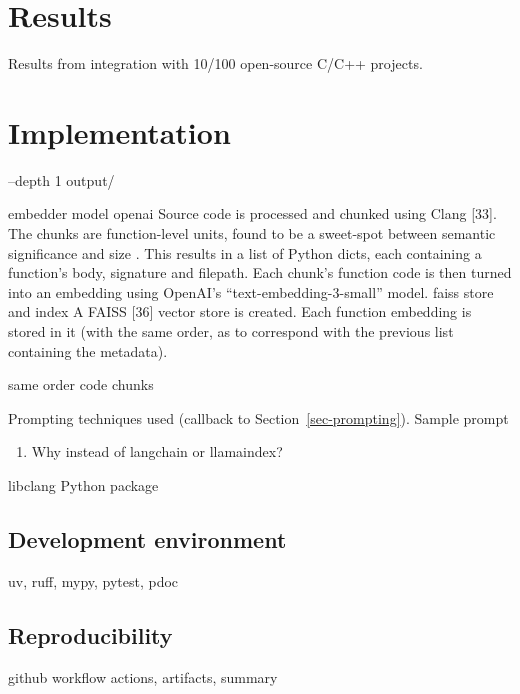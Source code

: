 \documentclass[
  a4paper,
  DIV=11,
  numbers=noendperiod]{scrreprt}
\providecommand{\tightlist}{%
  \setlength{\itemsep}{0pt}\setlength{\parskip}{0pt}}
\theoremstyle{definition}
\theoremstyle{remark}
\begin{document}
\chapter{Results}\label{results}

Results from integration with 10/100 open-source C/C++ projects.


\chapter{Implementation}\label{sec-implementation}

--depth 1 output/

embedder model openai Source code is processed and chunked using Clang
{[}33{]}. The chunks are function-level units, found to be a sweet-spot
between semantic significance and size \autocite{zhao2024,chen2021}.
This results in a list of Python dicts, each containing a function's
body, signature and filepath. Each chunk's function code is then turned
into an embedding using OpenAI's ``text-embedding-3-small'' model. faiss
store and index A FAISS {[}36{]} vector store is created. Each function
embedding is stored in it (with the same order, as to correspond with
the previous list containing the metadata).

same order code chunks

Prompting techniques used (callback to Section~\ref{sec-prompting}).
Sample prompt

\autocite{dspy}

\begin{enumerate}
\def\labelenumi{\arabic{enumi}.}
\tightlist
\item
  Why instead of langchain or llamaindex?
  \autocite{langchain,llamaindex}
\end{enumerate}

libclang Python package

\section{Development environment}\label{development-environment}

uv, ruff, mypy, pytest, pdoc

\section{Reproducibility}\label{reproducibility}

github workflow actions, artifacts, summary
\end{document}
